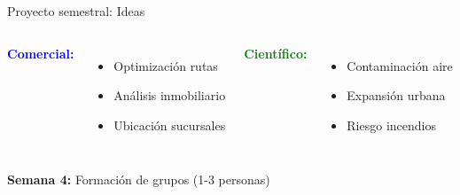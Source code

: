 \documentclass[10pt]{beamer}
\begin{document}
\begin{frame}{Proyecto semestral: Ideas}
    \begin{columns}
        \textcolor{blue}{ \textbf{Comercial:}}
        \begin{itemize}
            \item Optimización rutas
            \item Análisis inmobiliario
            \item Ubicación sucursales
        \end{itemize}
        
        \textcolor{green}{ \textbf{Científico:}}
        \begin{itemize}
            \item Contaminación aire
            \item Expansión urbana
            \item Riesgo incendios
        \end{itemize}
    \end{columns}
    
    \vspace{0.5cm}
    \begin{center}
        \begin{tcolorbox}[colframe=usachblue, width=9cm]
            \centering
            \textbf{Semana 4:} Formación de grupos (1-3 personas)
        \end{tcolorbox}
    \end{center}
\end{frame}
\end{document}
